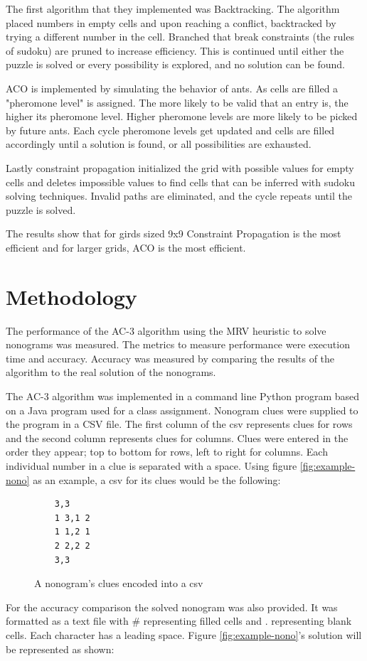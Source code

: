\documentclass[12pt, letterpaper]
{article}
\begin{document}
    The first algorithm that they implemented was Backtracking. The algorithm placed numbers in empty cells and upon reaching a conflict, backtracked by trying a different number in the cell. Branched that break constraints (the rules of sudoku) are pruned to increase efficiency. This is continued until either the puzzle is solved or every possibility is explored, and no solution can be found.

    ACO is implemented by simulating the behavior of ants. As cells are filled a "pheromone level" is assigned. The more likely to be valid that an entry is, the higher its pheromone level. Higher pheromone levels are more likely to be picked by future ants. Each cycle pheromone levels get updated and cells are filled accordingly until a solution is found, or all possibilities are exhausted.

    Lastly constraint propagation initialized the grid with possible values for empty cells and deletes impossible values to find cells that can be inferred with sudoku solving techniques. Invalid paths are eliminated, and the cycle repeats until the puzzle is solved.

    The results show that for girds sized 9x9 Constraint Propagation is the most efficient and for larger grids, ACO is the most efficient.

\section{Methodology}
The performance of the AC-3 algorithm using the MRV heuristic to solve nonograms was measured. The metrics to measure performance were execution time and accuracy. Accuracy was measured by comparing the results of the algorithm to the real solution of the nonograms.

The AC-3 algorithm was implemented in a command line Python program based on a Java program used for a class assignment. Nonogram clues were supplied to the program in a CSV file. The first column of the csv represents clues for rows and the second column represents clues for columns. Clues were entered in the order they appear; top to bottom for rows, left to right for columns. Each individual number in a clue is separated with a space. Using figure \ref{fig:example-nono} as an example, a csv for its clues would be the following:
\begin{figure}[H]
    \caption{A nonogram's clues encoded into a csv}
    \begin{lstlisting}
    3,3
    1 3,1 2
    1 1,2 1
    2 2,2 2
    3,3
    \end{lstlisting}
\end{figure}
For the accuracy comparison the solved nonogram was also provided. It was formatted as a text file with \# representing filled cells and . representing blank cells. Each character has a leading space. Figure \ref{fig:example-nono}'s solution will be represented as shown:
\end{document}

